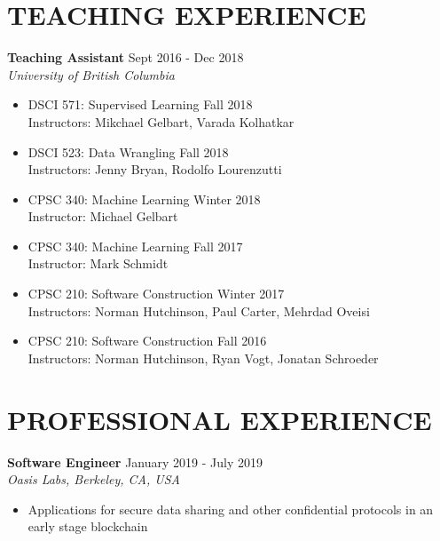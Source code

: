 \documentclass[10pt]{res} %
\begin{document}

\section{TEACHING EXPERIENCE}

\vspace{0.2in} %

\textbf{Teaching Assistant} \hfill Sept 2016 - Dec 2018 \\
{\sl University of British Columbia } \\
\begin{itemize}    
    \item DSCI 571: Supervised Learning \hfill Fall 2018 \\
    Instructors: Mikchael Gelbart, Varada Kolhatkar
    \item DSCI 523: Data Wrangling \hfill Fall 2018 \\
    Instructors: Jenny Bryan, Rodolfo Lourenzutti
    \item CPSC 340: Machine Learning \hfill Winter 2018 \\
    Instructor: Michael Gelbart
    \item CPSC 340: Machine Learning \hfill Fall 2017 \\
    Instructor: Mark Schmidt
    \item CPSC 210: Software Construction \hfill Winter 2017 \\
    Instructors: Norman Hutchinson, Paul Carter, Mehrdad Oveisi
    \item CPSC 210: Software Construction \hfill Fall 2016 \\
    Instructors: Norman Hutchinson, Ryan Vogt, Jonatan Schroeder
\end{itemize}


\section{PROFESSIONAL EXPERIENCE} 

\vspace{0.2in} %

\textbf{Software Engineer} \hfill January 2019 - July 2019 \\
{\sl Oasis Labs, Berkeley, CA, USA }
\begin{itemize}  %
    \item Applications for secure data sharing and other confidential protocols in an early stage blockchain
\end{itemize}
\end{document}
